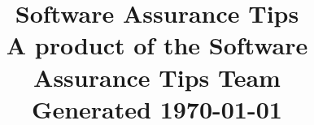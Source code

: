 \documentclass[letterpaper, 10pt]{article}
\author{\AuthorName}
\date{\ArticleDate}
\title{
	\textmd{\textbf{Software Assurance Tips}}\\
	\normalsize{A product of the Software Assurance Tips Team\autocite{swatips}}\\
	\vspace{.5em}
	Generated \today
}
\begin{document}
\maketitle
\clearpage
\section{\ArticleName}

\clearpage
\printbibliography
\end{document}
